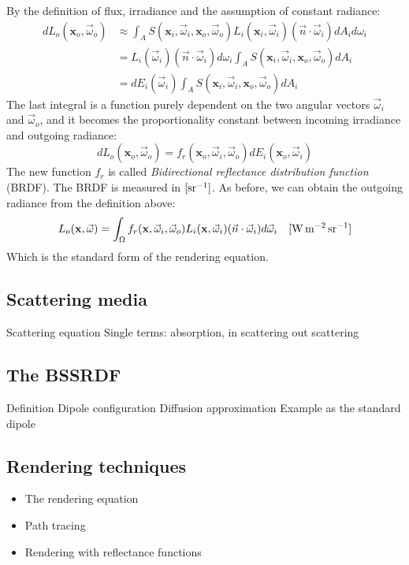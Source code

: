 By the definition of flux, irradiance and the assumption of constant radiance:
\begin{equation*}
\begin{split}
d L_o(\mathbf{x}_o, \vec{\omega}_o) &\approx \int_A S(\mathbf{x}_i, \vec{\omega}_i, \mathbf{x}_o, \vec{\omega}_o) L_i(\mathbf{x}_i, \vec{\omega}_i) (\vec{n} \cdot \vec{\omega}_i) d A_i d \omega_i  \\ &= L_i(\vec{\omega}_i) (\vec{n} \cdot \vec{\omega}_i) d \omega_i \int_A S(\mathbf{x}_i, \vec{\omega}_i, \mathbf{x}_o, \vec{\omega}_o)   d A_i \\ &= d E_i(\vec{\omega}_i) \int_A S(\mathbf{x}_i, \vec{\omega}_i, \mathbf{x}_o, \vec{\omega}_o) d A_i
\end{split}
\end{equation*}
The last integral is a function purely dependent on the two angular vectors $\vec{\omega}_i$ and $\vec{\omega}_o$, and it becomes the proportionality constant between incoming irradiance and outgoing radiance:
$$
d L_o(\mathbf{x}_o, \vec{\omega}_o) = f_r(\mathbf{x}_o, \vec{\omega}_i, \vec{\omega}_o) d E_i(\mathbf{x}_o, \vec{\omega}_i)
$$
 The new function $f_r$ is called \emph{Bidirectional reflectance distribution function} (BRDF). The BRDF is measured in $\siunitnospace{\per \steradian}$. As before, we can obtain the outgoing radiance from the definition above:
$$
L_o(\mathbf{x}, \vec{\omega}) = \int_\Omega f_r(\mathbf{x}, \vec{\omega}_i,  \vec{\omega}_o) L_i(\mathbf{x}, \vec{\omega}_i) (\vec{n} \cdot \vec{\omega}_i) d\vec{\omega}_i  \siunit{\watt \per \square \metre \per \steradian}
$$
Which is the standard form of the rendering equation.

\subsection{Scattering media}
Scattering equation
Single terms: absorption, in scattering out scattering

\subsection{The BSSRDF}
Definition
Dipole configuration
Diffusion approximation
Example as the standard dipole

\subsection{Rendering techniques}
\begin{itemize}
\item The rendering equation
\item Path tracing
\item Rendering with reflectance functions
\end{itemize}

